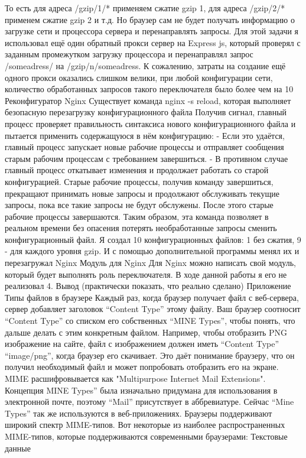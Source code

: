 \documentclass[12pt]{article}
\begin{document}
То есть для адреса /gzip/1/* применяем сжатие gzip 1, для адреса /gzip/2/* применем сжатие gzip 2 и т.д. Но браузер сам не будет получать информацию о загрузке сети и процессора сервера и перенаправлять запросы. Для этой задачи я использовал ещё один обратный прокси сервер на Express js, который проверял с заданным промежутком загрузку процессора и перенаправлял запрос /someadress/ на /gzip/n/someadress. 
К сожалению, затраты на создание ещё одного прокси оказались слишком велики, при любой конфигурации сети, количество обработанных запросов такого переключателя было более чем на 10%
Реконфигуратор Nginx
Существует команда nginx -s reload, которая выполняет безопасную перезагрузку конфигурационного файла
Получив сигнал, главный процесс проверяет правильность синтаксиса нового конфигурационного файла и пытается применить содержащуюся в нём конфигурацию:
- Если это удаётся, главный процесс запускает новые рабочие процессы и отправляет сообщения старым рабочим процессам с требованием завершиться.
- В противном случае главный процесс откатывает изменения и продолжает работать со старой конфигурацией.  
Старые рабочие процессы, получив команду завершиться, прекращают принимать новые запросы и продолжают обслуживать текущие запросы, пока все такие запросы не будут обслужены. После этого старые рабочие процессы завершаются.  
Таким образом, эта команда позволяет в реальном времени без опасения потерять необработанные запросы сменить конфигурационный файл. Я создал 10 конфигурационных файлов: 1 без сжатия, 9 - для каждого уровня gzip. И с помощью дополнительной программы менял их и перезагружал Nginx
Модуль для Nginx
Для Nginx можно написать свой модуль, который будет выполнять роль переключателя. В ходе данной работы я его не реализовал 
4. Вывод (практически показать, что реально сделано)
Приложение
Типы файлов в браузере
Каждый раз, когда браузер получает файл с веб-сервера, сервер добавляет заголовок “Content Type” этому файлу. Ваш браузер соотносит “Content Type” со списком его собственных “MINE Types”, чтобы понять, что дальше делать с этим конкретным файлом.
Например, чтобы отобразить PNG изображение на сайте, файл с изображением должен иметь “Content Type” “image/png”, когда браузер его скачивает. Это даёт понимание браузеру, что он получил необходимый файл и может попробовать отобразить его на экране.
MIME расшифровывается как "Multipurpose Internet Mail Extensions". Концепция MINE Types” была изначально придумана для использования в электронной почте, поэтому “Mail” присутствует в аббревиатуре. Сейчас “Mine Types” так же используются в веб-приложениях.
Браузеры поддерживают широкий спектр MIME-типов. Вот некоторые из наиболее распространенных MIME-типов, которые поддерживаются современными браузерами:
Текстовые данные
\end{document}
